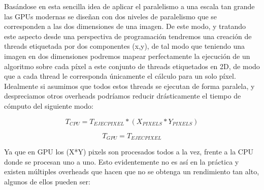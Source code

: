 Basándose en esta sencilla idea de aplicar el paralelismo a una escala tan grande las GPUs modernas se diseñan con dos niveles de paralelismo que se corresponden a las dos dimensiones de una imagen. De este modo, y tratando este aspecto desde una perspectiva de programación tendremos una creación de threads etiquetada por dos componentes (x,y), de tal modo que teniendo una imagen en dos dimensiones podremos mapear perfectamente la ejecución de un algoritmo sobre cada píxel a este conjunto de threads etiquetados en 2D, de modo que a cada thread le corresponda únicamente el cálculo  para un solo píxel. Idealmente si asumimos que todos estos threads se ejecutan de forma paralela, y despreciamos otros overheads podríamos reducir drásticamente el tiempo de cómputo del siguiente modo:

\begin{equation}
   T_{CPU}=T_{EJECPIXEL}*(X_{PIXELS}*Y_{PIXELS})
 \end{equation}
 
 \begin{equation}
 T_{GPU}=T_{EJECPIXEL}
 \end{equation}
 
Ya que en GPU los (X*Y) pixels son procesados todos a la vez, frente a la CPU donde se procesan uno a uno.
Esto evidentemente no es así en la práctica y existen múltiples overheads que hacen que no se obtenga un rendimiento tan alto, algunos de ellos pueden ser:

